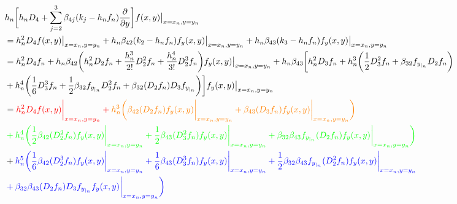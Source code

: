 \documentclass[12 pt]{article}
\begin{document}
	\begin{align*}
		&h_{n}\bigg[h_{n}D_{4} + \sum_{j=2}^{3}\beta_{4j}(k_{j} - h_{n}f_{n})\frac{\partial}{\partial y}\bigg]f(x,y)\big\vert_{x = x_{n}, y= y_{n}}\\
		&= h_{n}^{2}D_{4}f(x,y)\big\vert_{x = x_{n}, y= y_{n}} + h_{n}\beta_{42}(k_{2}-h_{n}f_{n})f_{y}(x,y)\big\vert_{x = x_{n}, y= y_{n}} + h_{n}\beta_{43}(k_{3}-h_{n}f_{n})f_{y}(x,y)\big\vert_{x = x_{n}, y= y_{n}}\\
		&= h_{n}^{2}D_{4}f_{n} + h_{n}\beta_{42}\bigg(h_{n}^{2}D_{2}f_{n} + \frac{h_{n}^{3}}{2!}D_{2}^{2}f_{n} + \frac{h_{n}^{4}}{3!}D_{2}^{3}f_{n}\bigg)f_{y}(x,y)\big\vert_{x = x_{n}, y= y_{n}} + h_{n}\beta_{43}\bigg[h_{n}^{2}D_{3}f_{n} + h_{n}^{3}\bigg(\frac{1}{2}D_{3}^{2}f_{n} + \beta_{32}f_{y_{|_{n}}}D_{2}f_{n}\bigg) \\
		&+ h_{n}^{4}\bigg(\frac{1}{6}D_{3}^{3}f_{n} + \frac{1}{2}\beta_{32}f_{y_{|_{n}}}D_{2}^{2}f_{n} + \beta_{32}(D_{2}f_{n})D_{3}f_{y_{|_{n}}}\bigg)\bigg]f_{y}(x,y)\big\vert_{x = x_{n}, y= y_{n}}\\
		&= \color{red}h_{n}^{2}D_{4}f(x,y)\bigg\vert_{x=x_{n}, y= y_{n}} + \color{orange}h_{n}^{3}\bigg(\beta_{42}(D_{2}f_{n})f_{y}(x,y)\bigg\vert_{x=x_{n}, y= y_{n}} + \beta_{43}(D_{3}f_{n})f_{y}(x,y)\bigg\vert_{x=x_{n}, y= y_{n}}\bigg) \\
		&\color{green}+ h_{n}^{4}\bigg(\frac{1}{2}\beta_{42}(D_{2}^{2}f_{n})f_{y}(x,y)\bigg\vert_{x=x_{n}, y= y_{n}} + \frac{1}{2}\beta_{43}(D_{3}^{2}f_{n})f_{y}(x,y)\bigg\vert_{x=x_{n}, y= y_{n}} + \beta_{32}\beta_{43}f_{y_{|_{n}}}(D_{2}f_{n})f_{y}(x,y)\bigg\vert_{x=x_{n}, y= y_{n}}\bigg)\\
		&+\color{blue}h_{n}^{5}\bigg(\frac{1}{6}\beta_{42}(D_{2}^{3}f_{n})f_{y}(x,y)\bigg\vert_{x=x_{n}, y= y_{n}} +\frac{1}{6}\beta_{43}(D_{3}^{3}f_{n})f_{y}(x,y)\bigg\vert_{x=x_{n}, y= y_{n}} + \frac{1}{2}\beta_{32}\beta_{43}f_{y_{|_{n}}}(D_{2}^{2}f_{n})f_{y}(x,y)\bigg\vert_{x=x_{n}, y= y_{n}} \\
		&\color{blue}+ \beta_{32}\beta_{43}(D_{2}f_{n})D_{3}f_{y_{|_{n}}}f_{y}(x,y)\bigg\vert_{x=x_{n}, y= y_{n}}\bigg)
	\end{align*}
	
\end{document}
